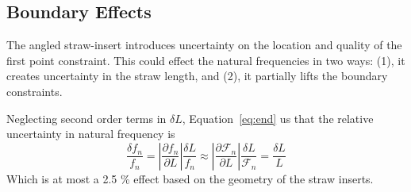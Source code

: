 \documentclass[twoside]{article}
\begin{document}
\begin{multicols}{2}




\section{Boundary Effects}
\label{sec:boun}
The angled straw-insert introduces uncertainty on the location and quality of the first point constraint.  This could effect the natural frequencies in two ways: (1), it creates uncertainty in the straw length, and (2), it partially lifts the boundary constraints.

Neglecting second order terms in $\delta L$, Equation~\ref{eq:end} us that the relative uncertainty in natural frequency is
\begin{equation}
\frac{\delta f_n}{f_n} =|\frac{\partial f_n}{\partial L}| \frac{\delta L}{f_n} \approx |\frac{\partial \mathcal{F}_n}{\partial L}|\frac{\delta L}{\mathcal{F}_n} = \frac{\delta L}{L}
\end{equation} 
Which is at most a 2.5 \% effect based on the geometry of the straw inserts.


\end{multicols}
\end{document}
